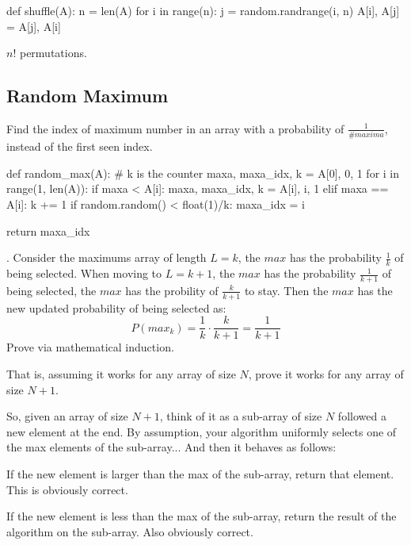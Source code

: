 \begin{python}
def shuffle(A):
  n = len(A)
  for i in range(n):
    j = random.randrange(i, n)
    A[i], A[j] = A[j], A[i]
\end{python}


$n!$ permutations. 

\subsection{Random Maximum}
Find the index of maximum number in an array with a probability of $\frac{1}{\#maxima}$, instead of the first seen index.


\begin{python}
def random_max(A):
    # k is the counter
    maxa, maxa_idx, k = A[0], 0, 1
    for i in range(1, len(A)):
        if maxa < A[i]:
            maxa, maxa_idx, k = A[i], i, 1
        elif maxa == A[i]:
            k += 1 
            if random.random() < float(1)/k:
                maxa_idx = i

    return maxa_idx

\end{python}

. Consider the maximums array of length $L=k$, the  $max$ has the probability $\frac{1}{k}$ of being selected. When moving to $L=k+1$, the  $max$ has the probability $\frac{1}{k+1}$ of being selected, the  $max$ has the probility of $\frac{k}{k+1}$ to stay. Then the  $max$ has the new updated probability of being selected as:
$$
P(max_k) = \frac{1}{k} \cdot \frac{k}{k+1} = \frac{1}{k+1}
$$
 Prove via mathematical induction. 

That is, assuming it works for any array of size $N$, prove it works for any array of size $N+1$.

So, given an array of size $N+1$, think of it as a sub-array of size $N$ followed a new element at the end. By assumption, your algorithm uniformly selects one of the max elements of the sub-array... And then it behaves as follows:

If the new element is larger than the max of the sub-array, return that element. This is obviously correct.

If the new element is less than the max of the sub-array, return the result of the algorithm on the sub-array. Also obviously correct.

